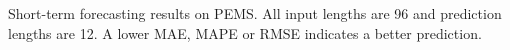
\begin{table}[t!]
    \small
    \centering
    \caption{Short-term forecasting results on PEMS. All input lengths are 96 and prediction lengths are 12. A lower MAE, MAPE or RMSE indicates a better prediction.}
    \label{tab:pems_short}
    \vspace{-6pt}
    \setlength{\tabcolsep}{3.2pt}
    \renewcommand{\arraystretch}{1}

    \newcommand{\gc}{\cellcolor{gray!10}}
    \newcommand{\win}[1]{\textbf{#1}}
    \newcommand{\secbest}[1]{\underline{#1}}


\end{table}
